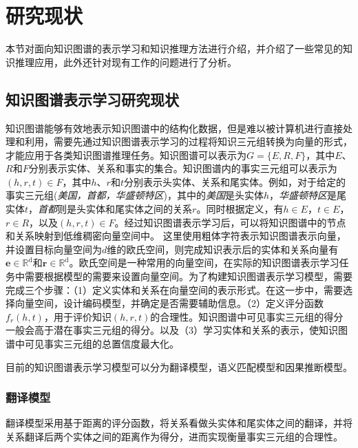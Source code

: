 \documentclass[algorithmlist, AutoFakeBold, AutoFakeSlant, figurelist, tablelist, nomlist, engineering]{seuthesix}
\begin{document}
\section{研究现状}
本节对面向知识图谱的表示学习和知识推理方法进行介绍，并介绍了一些常见的知识推理应用，此外还针对现有工作的问题进行了分析。

\subsection{知识图谱表示学习研究现状}
知识图谱能够有效地表示知识图谱中的结构化数据，但是难以被计算机进行直接处理和利用，需要先通过知识图谱表示学习的过程将知识三元组转换为向量的形式，才能应用于各类知识图谱推理任务。知识图谱可以表示为$G=\{E, R, F\}$，其中$E$、$R$和$F$分别表示实体、关系和事实的集合。知识图谱内的事实三元组可以表示为$(h, r, t) \in F$，其中$h$、$r$和$t$分别表示头实体、关系和尾实体。例如，对于给定的事实三元组(\textit{美国，首都，华盛顿特区})，其中的\textit{美国}是头实体$h$，\textit{华盛顿特区}是尾实体$t$，\textit{首都}则是头实体和尾实体之间的关系$r$。同时根据定义，有$h \in E$，$t \in E$，$r \in R$，以及$(h, r, t) \in F$。经过知识图谱表示学习后，可以将知识图谱中的节点和关系映射到低维稠密向量空间中。
这里使用粗体字符表示知识图谱表示向量，并设置目标向量空间为$d$维的欧氏空间，则完成知识表示后的实体和关系向量有$\bm{e} \in \mathbb{R}^{\mathrm{d}}$和$\bm{r} \in \mathbb{R}^{\mathrm{d}}$。欧氏空间是一种常用的向量空间，在实际的知识图谱表示学习任务中需要根据模型的需要来设置向量空间。为了构建知识图谱表示学习模型，需要完成三个步骤：（1）定义实体和关系在向量空间的表示形式。在这一步中，需要选择向量空间，设计编码模型，并确定是否需要辅助信息。（2）定义评分函数$f_r(h, t)$，用于评价知识$(h, r, t)$的合理性。知识图谱中可见事实三元组的得分一般会高于潜在事实三元组的得分。以及（3）学习实体和关系的表示，使知识图谱中可见事实三元组的总置信度最大化。

目前的知识图谱表示学习模型可以分为翻译模型，语义匹配模型和因果推断模型。

\subsubsection{翻译模型}
翻译模型采用基于距离的评分函数，将关系看做头实体和尾实体之间的翻译，并将关系翻译后两个实体之间的距离作为得分，进而实现衡量事实三元组的合理性。
\end{document}
